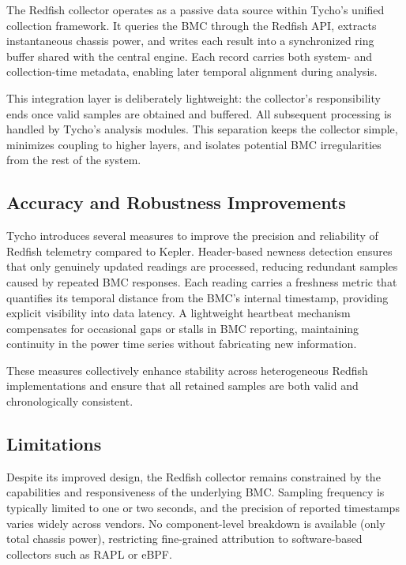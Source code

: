 The Redfish collector operates as a passive data source within Tycho’s unified collection framework.  
It queries the BMC through the Redfish API, extracts instantaneous chassis power, and writes each result into a synchronized ring buffer shared with the central engine.  
Each record carries both system- and collection-time metadata, enabling later temporal alignment during analysis.  

This integration layer is deliberately lightweight: the collector’s responsibility ends once valid samples are obtained and buffered.  
All subsequent processing is handled by Tycho’s analysis modules.  
This separation keeps the collector simple, minimizes coupling to higher layers, and isolates potential BMC irregularities from the rest of the system.

\subsection{Accuracy and Robustness Improvements}
\label{subsec:redfish_accuracy}

Tycho introduces several measures to improve the precision and reliability of Redfish telemetry compared to Kepler.  
Header-based newness detection ensures that only genuinely updated readings are processed, reducing redundant samples caused by repeated BMC responses.  
Each reading carries a freshness metric that quantifies its temporal distance from the BMC’s internal timestamp, providing explicit visibility into data latency. A lightweight heartbeat mechanism compensates for occasional gaps or stalls in BMC reporting, maintaining continuity in the power time series without fabricating new information.  

These measures collectively enhance stability across heterogeneous Redfish implementations and ensure that all retained samples are both valid and chronologically consistent.

\subsection{Limitations}
\label{subsec:redfish_limitations}

Despite its improved design, the Redfish collector remains constrained by the capabilities and responsiveness of the underlying BMC.  
Sampling frequency is typically limited to one or two seconds, and the precision of reported timestamps varies widely across vendors.  
No component-level breakdown is available (only total chassis power), restricting fine-grained attribution to software-based collectors such as RAPL or eBPF.